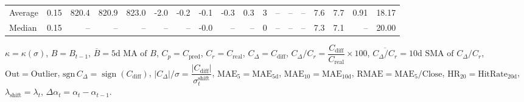 \begin{threeparttable}
{\begin{tabular}{lrrrrrrrrrrrrrrrrr}
Average &     0.15 & 820.4 & 820.9 & 823.0 &       -2.0 &           -0.2 &                      -0.1 &                     -0.3 &                 0.3 &              3 &         -- &        -- &             -- &              7.6 &                 7.7 &            0.91 &                  18.17 \\
 Median &     0.15 &    -- &    -- &    -- &         -- &             -- &                      -0.0 &                       -- &                  -- &              0 &         -- &        -- &             -- &              7.3 &                 7.1 &              -- &                  20.00 \\
\bottomrule
\end{tabular}
}
\begin{tablenotes}\footnotesize
\item $\kappa=\kappa(\sigma)$, $B=B_{t-1}$, $\overline{B}=\text{5d MA of }B$, $C_p=C_{\text{pred}}$, $C_r=C_{\text{real}}$, $C_\Delta=C_{\text{diff}}$, $C_\Delta/C_r=\dfrac{C_{\text{diff}}}{C_{\text{real}}}\times100$, $\overline{C_\Delta/C_r}=\text{10d SMA of }C_\Delta/C_r$, $\mathrm{Out}=\text{Outlier}$, $\mathrm{sgn}\,C_\Delta=\operatorname{sign}(C_{\text{diff}})$, $|C_\Delta|/\sigma=\dfrac{|C_{\text{diff}}|}{\sigma_t^{\text{shift}}}$, $\mathrm{MAE}_5=\mathrm{MAE}_{5\text{d}}$, $\mathrm{MAE}_{10}=\mathrm{MAE}_{10\text{d}}$, $\mathrm{RMAE}= \mathrm{MAE}_5 / \text{Close}$, $\mathrm{HR}_{20}=\mathrm{HitRate}_{20\text{d}}$, $\lambda_{\text{shift}}=\lambda_t$, $\Delta\alpha_t=\alpha_t-\alpha_{t-1}$.
\end{tablenotes}
\end{threeparttable}
\endgroup

